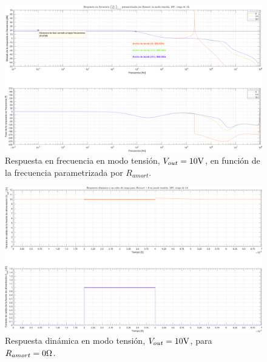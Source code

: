 \begin{figure}[H] %
\begin{center}
\includegraphics[width=1.1 \textwidth, angle=90]{./img/plots/rf/power_supply_RAMORT_RF_Modo1.png}
\caption{\label{fig:fig_power_supply_RAMORT_RF_Modo1}\footnotesize{Respuesta en frecuencia en modo tensión, $V_{out} = 10 \si[per-mode=symbol]{\volt}$, en función de la frecuencia parametrizada por $R_{amort}$.}}
\end{center}
\end{figure}

\clearpage

\begin{figure}[H] %
\begin{center}
\includegraphics[width=1.1 \textwidth, angle=90]{./img/plots/dynamic/power_supply_RAMORT_0_STEP_Modo1.png}
\caption{\label{fig:fig_power_supply_RAMORT_STEP_0_Modo1}\footnotesize{Respuesta dinámica en modo tensión, $V_{out} = 10 \si[per-mode=symbol]{\volt}$, para $R_{amort} = 0 \si[per-mode=symbol]{\ohm} $.}}
\end{center}
\end{figure}

